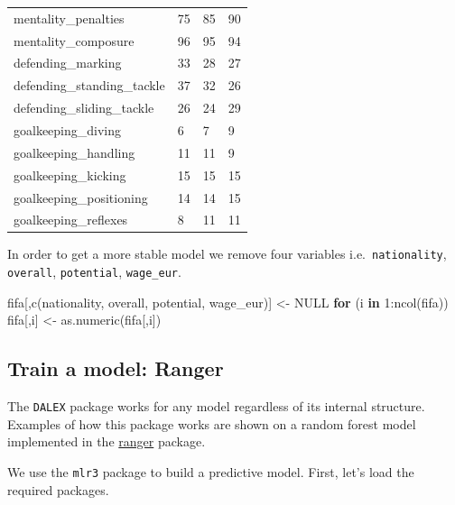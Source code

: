 \documentclass[
]{scrbook}
\newenvironment{Shaded}{\begin{snugshade}}{\end{snugshade}}
\newcommand{\ConstantTok}[1]{\textcolor[rgb]{0.00,0.00,0.00}{#1}}
\newcommand{\ControlFlowTok}[1]{\textcolor[rgb]{0.13,0.29,0.53}{\textbf{#1}}}
\newcommand{\DecValTok}[1]{\textcolor[rgb]{0.00,0.00,0.81}{#1}}
\newcommand{\FunctionTok}[1]{\textcolor[rgb]{0.00,0.00,0.00}{#1}}
\newcommand{\NormalTok}[1]{#1}
\newcommand{\OtherTok}[1]{\textcolor[rgb]{0.56,0.35,0.01}{#1}}
\newcommand{\SpecialCharTok}[1]{\textcolor[rgb]{0.00,0.00,0.00}{#1}}
\newcommand{\StringTok}[1]{\textcolor[rgb]{0.31,0.60,0.02}{#1}}
\renewenvironment{Shaded} {\begin{snugshade}\small} {\end{snugshade}}
\begin{document}
\begin{longtable}[]{@{}llll@{}}
mentality\_penalties & 75 & 85 & 90 \\
mentality\_composure & 96 & 95 & 94 \\
defending\_marking & 33 & 28 & 27 \\
defending\_standing\_tackle & 37 & 32 & 26 \\
defending\_sliding\_tackle & 26 & 24 & 29 \\
goalkeeping\_diving & 6 & 7 & 9 \\
goalkeeping\_handling & 11 & 11 & 9 \\
goalkeeping\_kicking & 15 & 15 & 15 \\
goalkeeping\_positioning & 14 & 14 & 15 \\
goalkeeping\_reflexes & 8 & 11 & 11 \\
\bottomrule
\end{longtable}

In order to get a more stable model we remove four variables i.e.~\texttt{nationality}, \texttt{overall}, \texttt{potential}, \texttt{wage\_eur}.

\begin{Shaded}
\begin{Highlighting}[]
\NormalTok{fifa[,}\FunctionTok{c}\NormalTok{(}\StringTok{\textquotesingle{}nationality\textquotesingle{}}\NormalTok{, }\StringTok{\textquotesingle{}overall\textquotesingle{}}\NormalTok{, }\StringTok{\textquotesingle{}potential\textquotesingle{}}\NormalTok{, }\StringTok{\textquotesingle{}wage\_eur\textquotesingle{}}\NormalTok{)] }\OtherTok{\textless{}{-}} \ConstantTok{NULL}
\ControlFlowTok{for}\NormalTok{ (i }\ControlFlowTok{in} \DecValTok{1}\SpecialCharTok{:}\FunctionTok{ncol}\NormalTok{(fifa))           fifa[,i] }\OtherTok{\textless{}{-}} \FunctionTok{as.numeric}\NormalTok{(fifa[,i])}
\end{Highlighting}
\end{Shaded}

\hypertarget{interpretability-train-ranger}{%
\subsection{Train a model: Ranger}\label{interpretability-train-ranger}}

The \texttt{DALEX} package works for any model regardless of its internal structure. Examples of how this package works are shown on a random forest model implemented in the \href{https://cran.r-project.org/package=ranger}{ranger} package.

We use the \texttt{mlr3} package to build a predictive model.
First, let's load the required packages.
\end{document}
